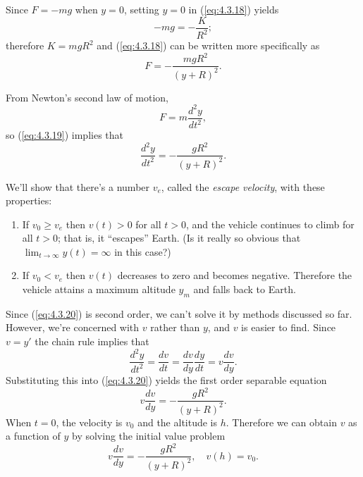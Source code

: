 \documentclass{ximera}
\begin{document}
 Since $F=-mg$ when $y=0$, setting $y=0$ in
(\ref{eq:4.3.18}) yields
$$
-mg=-\frac{K}{R^2};
$$
 therefore $K=mgR^2$ and (\ref{eq:4.3.18}) can be written more
specifically as
\begin{equation} \label{eq:4.3.19}
F=-\frac{mgR^2}{(y+R)^2}.
\end{equation}
 
From Newton's second law of motion,
$$
F=m\frac{d^2y}{dt^2},
$$
so (\ref{eq:4.3.19}) implies that
\begin{equation} \label{eq:4.3.20}
\frac{d^2y}{dt^2}=-\frac{gR^2}{(y+R)^2}.
\end{equation}
 
We'll show that there's a number $v_e$, called the \textit{escape
velocity}, with these properties:
 
\begin{enumerate}
\item If $v_0\geq v_e$ then $v(t)>0$ for all $t>0$, and the vehicle
continues to climb for all $t>0$; that is, it ``escapes'' Earth.
(Is it really so obvious that $\lim_{t\rightarrow\infty}y(t)=\infty$
in this case?)
\item  If $v_0<v_e$  then  $v(t)$   decreases to zero and becomes negative.
Therefore
 the vehicle attains a  maximum
altitude  $y_m$ and
falls back to Earth.
 \end{enumerate}
 
Since
(\ref{eq:4.3.20}) is second order, we can't solve it by methods discussed
so far. However, we're concerned with $v$ rather than $y$, and $v$ is
easier to find. Since $v=y'$ the chain rule implies that
$$
\frac{d^2y}{dt^2}=\frac{dv}{dt}=\frac{dv}{dy}\frac{dy}{dt}=v\frac{dv}{dy}.
$$
 Substituting this into (\ref{eq:4.3.20}) yields the first order
separable equation
\begin{equation} \label{eq:4.3.21}
v\frac{dv}{dy}=-\frac{gR^2}{(y+R)^2}.
\end{equation}
When $t=0$, the velocity is $v_0$ and the altitude is $h$. Therefore
we can
obtain $v$ as a function of $y$ by solving the initial value problem
$$
v\frac{dv}{dy}=-\frac{gR^2}{(y+R)^2},\quad  v(h)=v_0.
$$
 
\end{document}
